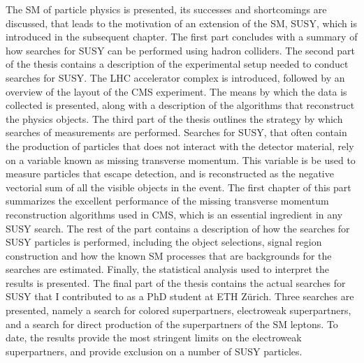 The SM of particle physics is presented, its successes and shortcomings are discussed, that leads to the motivation of an extension of the SM, SUSY, which is introduced in the subsequent chapter. 
The first part concludes with a summary of how searches for SUSY can be performed using hadron colliders. 
\newpara
\noindent\justify
The second part of the thesis contains a description of the experimental setup needed to conduct searches for SUSY. 
The LHC accelerator complex is introduced, followed by an overview of the layout of the CMS experiment. 
The means by which the data is collected is presented, along with a description of the algorithms that reconstruct the physics objects.  
\newpara
\noindent\justify
The third part of the thesis outlines the strategy by which searches of measurements are performed. 
Searches for SUSY, that often contain the production of particles that does not interact with the detector material, rely on a variable known as missing transverse momentum. 
This variable is be used to measure particles that escape detection, and is reconstructed as the negative vectorial sum of all the visible objects in the event. 
The first chapter of this part summarizes the excellent performance of the missing transverse momentum reconstruction algorithms used in CMS, which is an essential ingredient in any SUSY search. 
The rest of the part contains a description of how the searches for SUSY particles is performed, including the object selections, signal region construction and how the known SM processes that are backgrounds for the searches are estimated. 
Finally, the statistical analysis used to interpret the results is presented.   
\newpara
\noindent\justify
The final part of the thesis contains the actual searches for SUSY that I contributed to as a PhD student at ETH Z\"{u}rich. 
Three searches are presented, namely a search for colored superpartners, electroweak superpartners, and a search for direct production of the superpartners of the SM leptons. 
To date, the results provide the most stringent limits on the electroweak superpartners, and provide exclusion on a number of SUSY particles.   



